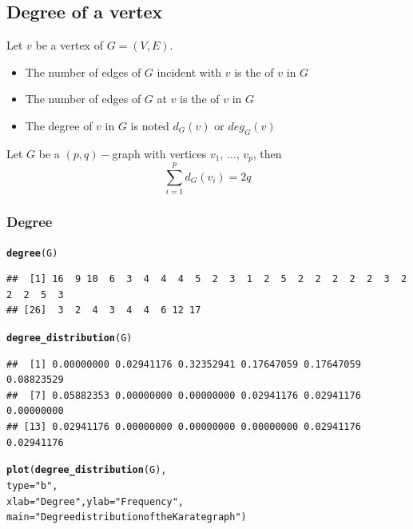 \documentclass[aspectratio=169]{beamer}\usepackage[]{graphicx}\usepackage[]{xcolor}
\makeatletter
\newcommand{\hlsng}[1]{\textcolor[rgb]{0.192,0.494,0.8}{#1}}%
\newcommand{\hldef}[1]{\textcolor[rgb]{0.345,0.345,0.345}{#1}}%
\newcommand{\hlkwc}[1]{\textcolor[rgb]{0.333,0.667,0.333}{#1}}%
\newcommand{\hlkwd}[1]{\textcolor[rgb]{0.737,0.353,0.396}{\textbf{#1}}}%
\newenvironment{kframe}{%
 \def\at@end@of@kframe{}%
 \ifinner\ifhmode%
  \def\at@end@of@kframe{\end{minipage}}%
  \begin{minipage}{\columnwidth}%
 \fi\fi%
 \def\FrameCommand##1{\hskip\@totalleftmargin \hskip-\fboxsep
 \colorbox{shadecolor}{##1}\hskip-\fboxsep
     \hskip-\linewidth \hskip-\@totalleftmargin \hskip\columnwidth}%
 \MakeFramed {\advance\hsize-\width
   \@totalleftmargin\z@ \linewidth\hsize
   \@setminipage}}%
 {\par\unskip\endMakeFramed%
 \at@end@of@kframe}
\newenvironment{knitrout}{}{} %
\makeatother
\begin{document}
\subsection{Degree of a vertex}

\begin{frame}
	\begin{definition}
	Let $v$ be a vertex of $G=(V,E)$.
	\begin{itemize}
	\item The number of edges of $G$ incident with $v$ is the  of $v$ in $G$
	\item The number of edges of $G$ at $v$ is the  of $v$ in $G$
	\item The degree of $v$ in $G$ is noted $d_G(v)$ or $deg_G(v)$
	\end{itemize}
	\end{definition}
	\vfill
	\begin{theorem}\label{th:sum-degrees}
	Let $G$ be a $(p,q)-$graph with vertices $v_1$, $\dots$, $v_p$, then
	\[
		\sum_{i=1}^{p}d_G(v_i)=2q
	\]
	\end{theorem}
\end{frame}

\begin{frame}[fragile]\frametitle{Degree}
\begin{knitrout}
\color{fgcolor}\begin{kframe}
\begin{alltt}
\hlkwd{degree}\hldef{(G)}
\end{alltt}
\begin{verbatim}
##  [1] 16  9 10  6  3  4  4  4  5  2  3  1  2  5  2  2  2  2  2  3  2  2  2  5  3
## [26]  3  2  4  3  4  4  6 12 17
\end{verbatim}
\begin{alltt}
\hlkwd{degree_distribution}\hldef{(G)}
\end{alltt}
\begin{verbatim}
##  [1] 0.00000000 0.02941176 0.32352941 0.17647059 0.17647059 0.08823529
##  [7] 0.05882353 0.00000000 0.00000000 0.02941176 0.02941176 0.00000000
## [13] 0.02941176 0.00000000 0.00000000 0.00000000 0.02941176 0.02941176
\end{verbatim}
\begin{alltt}
\hlkwd{plot}\hldef{(}\hlkwd{degree_distribution}\hldef{(G),}
     \hlkwc{type} \hldef{=} \hlsng{"b"}\hldef{,}
     \hlkwc{xlab} \hldef{=} \hlsng{"Degree"}\hldef{,} \hlkwc{ylab} \hldef{=} \hlsng{"Frequency"}\hldef{,}
     \hlkwc{main} \hldef{=} \hlsng{"Degree distribution of the Karate graph"}\hldef{)}
\end{alltt}
\end{kframe}
\end{knitrout}
\end{frame}
\end{document}
